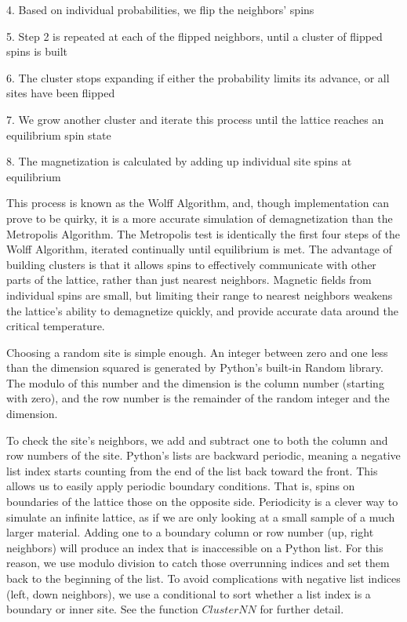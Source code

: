 \documentclass[a4paper]{article}
\begin{document}
 	
	4.	Based on individual probabilities, we flip the neighbors’ spins

 
	5.	Step 2 is repeated at each of the flipped neighbors, until a cluster of flipped spins is built


	6.	The cluster stops expanding if either the probability limits its advance, or all sites have been flipped

 
	7.	We grow another cluster and iterate this process until the lattice reaches an equilibrium spin state

 
	8.	The magnetization is calculated by adding up individual site spins at equilibrium

 
This process is known as the Wolff Algorithm, and, though implementation can prove to be quirky, it is a more accurate simulation of demagnetization than the Metropolis Algorithm. The Metropolis test is identically the first four steps of the Wolff Algorithm, iterated continually until equilibrium is met. The advantage of building clusters is that it allows spins to effectively communicate with other parts of the lattice, rather than just nearest neighbors. Magnetic fields from individual spins are small, but limiting their range to nearest neighbors weakens the lattice’s ability to demagnetize quickly, and provide accurate data around the critical temperature.


Choosing a random site is simple enough. An integer between zero and one less than the dimension squared is generated by Python’s built-in Random library. The modulo of this number and the dimension is the column number (starting with zero), and the row number is the remainder of the random integer and the dimension. 

To check the site’s neighbors, we add and subtract one to both the column and row numbers of the site. Python’s lists are backward periodic, meaning a negative list index starts counting from the end of the list back toward the front. This allows us to easily apply periodic boundary conditions. That is, spins on boundaries of the lattice those on the opposite side. Periodicity is a clever way to simulate an infinite lattice, as if we are only looking at a small sample of a much larger material. Adding one to a boundary column or row number (up, right neighbors) will produce an index that is inaccessible on a Python list. For this reason, we use modulo division to catch those overrunning indices and set them back to the beginning of the list.  To avoid complications with negative list indices (left, down neighbors), we use a conditional to sort whether a list index is a boundary or inner site. See the function $Cluster NN$ for further detail.
\end{document}

